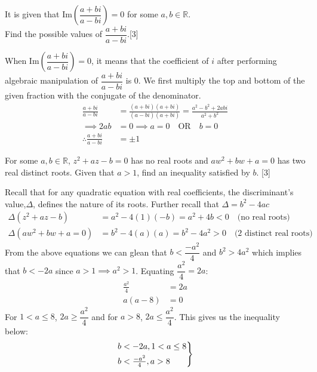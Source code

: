 \documentclass[12pt, a4 paper]{article}
\begin{document}
\begin{outline}[enumerate]
	\2 It is given that $\textrm{Im}(\dfrac{a+bi}{a-bi})=0$ for some $a,b \in \mathbb{R}$. \\ Find the possible values of $\dfrac{a+bi}{a-bi}$.\hfill[3] %
	\begin{answer}
		When $\textrm{Im}(\dfrac{a+bi}{a-bi})=0$, it means that the coefficient of $i$ after performing algebraic manipulation of $\dfrac{a+bi}{a-bi}$ is 0. We first multiply the top and bottom of the given fraction with the conjugate of the denominator.
		\begin{align*}
			\frac{a+bi}{a-bi}            & = \frac{(a+bi)(a+bi)}{(a-bi)(a+bi)} = \frac{a^2-b^2+2abi}{a^2+b^2} \\
			\implies 2ab                 & = 0 \implies a=0 \quad\textrm{OR}\quad b=0                         \\
			\therefore \frac{a+bi}{a-bi} & = \pm1                                                             
		\end{align*}
	\end{answer}
			        
	\2 For some $a,b \in \mathbb{R}$, $z^2+az-b=0$ has no real roots and $aw^2+bw+a=0$ has two real distinct roots. Given that $a>1$, find an inequality satisfied by $b$. \hfill[3] %
	\begin{answer}
		Recall that for any quadratic equation with real coefficients, the discriminant's value,$\Delta$, defines the nature of its roots. Further recall that $\Delta = b^2-4ac$
		\begin{align*}
			\Delta(z^2+az-b)    & = a^2-4(1)(-b) = a^2+4b < 0 \quad\textrm{(no real roots)}         \\
			\Delta(aw^2+bw+a=0) & = b^2-4(a)(a) = b^2-4a^2 >0 \quad\textrm{(2 distinct real roots)} 
		\end{align*}
		From the above equations we can glean that $b<\dfrac{-a^2}{4}$ and $b^2>4a^2$ which implies that $b<-2a$ since $a>1\implies a^2>1$. Equating $\dfrac{a^2}{4}=2a$:
		\begin{align*}
			\frac{a^2}{4} & =2a \\
			a(a-8)        & = 0 
		\end{align*}
		For $1<a\leq8$, $2a\geq\dfrac{a^2}{4}$ and for $a>8$, $2a\leq\dfrac{a^2}{4}$. This gives us the inequality below:
		\begin{align*}
			\begin{rcases}        
			b<-2a, 1<a\leq8       \\
			b<\frac{-a^2}{4}, a>8 
			\end{rcases}          
		\end{align*}
	\end{answer}
			        

\end{outline}
\end{document}

